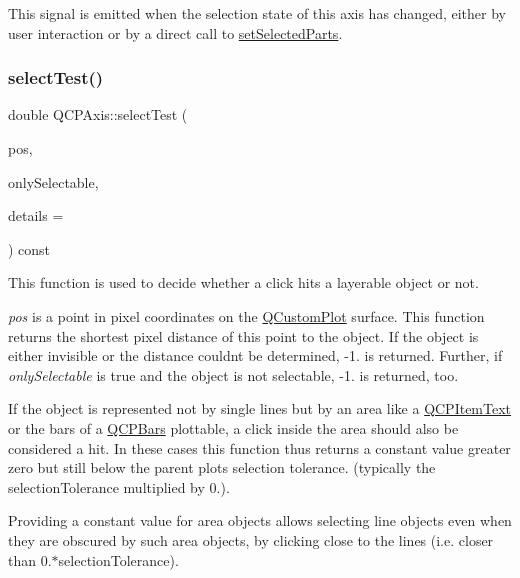 This signal is emitted when the selection state of this axis has changed, either by user interaction or by a direct call to \mbox{\hyperlink{class_q_c_p_axis_ab9d7a69277dcbed9119b3c1f25ca19c3}{set\+Selected\+Parts}}. \mbox{\label{class_q_c_p_axis_a48e4f1bafd1826ba2ad46b691205bb90}} 
\subsubsection{\texorpdfstring{select\+Test()}{selectTest()}}
{\footnotesize\ttfamily double Q\+C\+P\+Axis\+::select\+Test (\begin{DoxyParamCaption}\item[{const Q\+PointF \&}]{pos,  }\item[{bool}]{only\+Selectable,  }\item[{Q\+Variant $\ast$}]{details = {} }\end{DoxyParamCaption}) const\hspace{0.3cm}{\ttfamily [virtual]}}

This function is used to decide whether a click hits a layerable object or not.

{\itshape pos} is a point in pixel coordinates on the \mbox{\hyperlink{class_q_custom_plot}{Q\+Custom\+Plot}} surface. This function returns the shortest pixel distance of this point to the object. If the object is either invisible or the distance couldn\textquotesingle{}t be determined, -\/1. is returned. Further, if {\itshape only\+Selectable} is true and the object is not selectable, -\/1. is returned, too.

If the object is represented not by single lines but by an area like a \mbox{\hyperlink{class_q_c_p_item_text}{Q\+C\+P\+Item\+Text}} or the bars of a \mbox{\hyperlink{class_q_c_p_bars}{Q\+C\+P\+Bars}} plottable, a click inside the area should also be considered a hit. In these cases this function thus returns a constant value greater zero but still below the parent plot\textquotesingle{}s selection tolerance. (typically the selection\+Tolerance multiplied by 0.).

Providing a constant value for area objects allows selecting line objects even when they are obscured by such area objects, by clicking close to the lines (i.\+e. closer than 0.$\ast$selection\+Tolerance).

